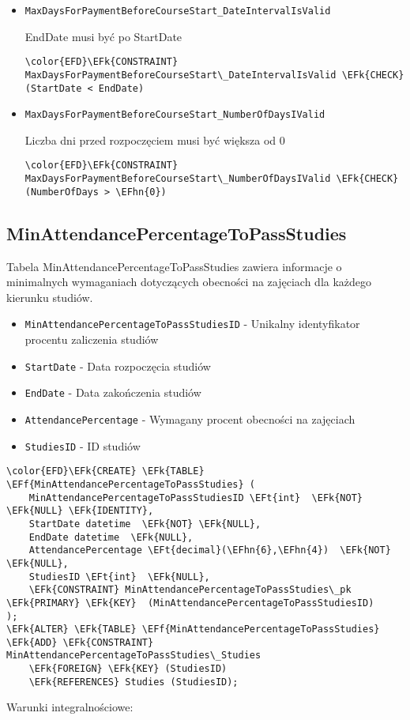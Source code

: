 \documentclass[11pt]{article}
\newcommand{\EFk}[1]{\textcolor{EFk}{\textbf{#1}}} %
\newcommand{\EFf}[1]{\textcolor{EFf}{#1}} %
\newcommand{\EFt}[1]{\textcolor{EFt}{\textbf{#1}}} %
\newcommand{\EFhn}[1]{\textcolor{EFhn}{#1}} %
\begin{document}
\begin{itemize}
\item \texttt{MaxDaysForPaymentBeforeCourseStart\_DateIntervalIsValid}

EndDate musi być po StartDate
\begin{Code}
\begin{Verbatim}
\color{EFD}\EFk{CONSTRAINT} MaxDaysForPaymentBeforeCourseStart\_DateIntervalIsValid \EFk{CHECK}
(StartDate < EndDate)
\end{Verbatim}
\end{Code}
\item \texttt{MaxDaysForPaymentBeforeCourseStart\_NumberOfDaysIValid}

Liczba dni przed rozpoczęciem musi być większa od 0
\begin{Code}
\begin{Verbatim}
\color{EFD}\EFk{CONSTRAINT} MaxDaysForPaymentBeforeCourseStart\_NumberOfDaysIValid \EFk{CHECK}
(NumberOfDays > \EFhn{0})
\end{Verbatim}
\end{Code}
\end{itemize}
\subsection{MinAttendancePercentageToPassStudies}
\label{sec:orgd3d8337}
Tabela MinAttendancePercentageToPassStudies zawiera informacje o minimalnych wymaganiach dotyczących obecności na zajęciach dla każdego kierunku studiów.
\begin{itemize}
\item \texttt{MinAttendancePercentageToPassStudiesID} - Unikalny identyfikator procentu zaliczenia studiów
\item \texttt{StartDate} - Data rozpoczęcia studiów
\item \texttt{EndDate} - Data zakończenia studiów
\item \texttt{AttendancePercentage} - Wymagany procent obecności na zajęciach
\item \texttt{StudiesID} - ID studiów
\end{itemize}
\begin{Code}
\begin{Verbatim}
\color{EFD}\EFk{CREATE} \EFk{TABLE} \EFf{MinAttendancePercentageToPassStudies} (
    MinAttendancePercentageToPassStudiesID \EFt{int}  \EFk{NOT} \EFk{NULL} \EFk{IDENTITY},
    StartDate datetime  \EFk{NOT} \EFk{NULL},
    EndDate datetime  \EFk{NULL},
    AttendancePercentage \EFt{decimal}(\EFhn{6},\EFhn{4})  \EFk{NOT} \EFk{NULL},
    StudiesID \EFt{int}  \EFk{NULL},
    \EFk{CONSTRAINT} MinAttendancePercentageToPassStudies\_pk \EFk{PRIMARY} \EFk{KEY}  (MinAttendancePercentageToPassStudiesID)
);
\EFk{ALTER} \EFk{TABLE} \EFf{MinAttendancePercentageToPassStudies} \EFk{ADD} \EFk{CONSTRAINT} MinAttendancePercentageToPassStudies\_Studies
    \EFk{FOREIGN} \EFk{KEY} (StudiesID)
    \EFk{REFERENCES} Studies (StudiesID);
\end{Verbatim}
\end{Code}
Warunki integralnościowe:
\end{document}
